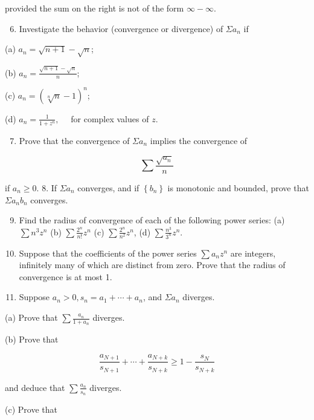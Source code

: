 \documentclass[10pt]{article}
\begin{document}
provided the sum on the right is not of the form $\infty-\infty$.

\begin{enumerate}
  \setcounter{enumi}{5}
  \item Investigate the behavior (convergence or divergence) of $\Sigma a_{n}$ if
\end{enumerate}

(a) $a_{n}=\sqrt{n+1}-\sqrt{n}$;

(b) $a_{n}=\frac{\sqrt{n+1}-\sqrt{n}}{n}$;

(c) $a_{n}=(\sqrt[n]{n}-1)^{n}$;

(d) $a_{n}=\frac{1}{1+z^{n}}, \quad$ for complex values of $z$.

\begin{enumerate}
  \setcounter{enumi}{6}
  \item Prove that the convergence of $\Sigma a_{n}$ implies the convergence of
\end{enumerate}

$$
\sum \frac{\sqrt{a_{n}}}{n}
$$

if $a_{n} \geq 0$. 8. If $\Sigma a_{n}$ converges, and if $\left\{b_{n}\right\}$ is monotonic and bounded, prove that $\Sigma a_{n} b_{n}$ converges.

\begin{enumerate}
  \setcounter{enumi}{8}
  \item Find the radius of convergence of each of the following power series:
(a) $\sum n^{3} z^{n}$
(b) $\sum \frac{2^{n}}{n !} z^{n}$
(c) $\sum \frac{2^{n}}{n^{2}} z^{n}$,
(d) $\sum \frac{n^{3}}{3^{n}} z^{n}$.

  \item Suppose that the coefficients of the power series $\sum a_{n} z^{n}$ are integers, infinitely many of which are distinct from zero. Prove that the radius of convergence is at most 1.

  \item Suppose $a_{n}>0, s_{n}=a_{1}+\cdots+a_{n}$, and $\Sigma a_{n}$ diverges.

\end{enumerate}

(a) Prove that $\sum \frac{a_{n}}{1+a_{n}}$ diverges.

(b) Prove that

$$
\frac{a_{N+1}}{s_{N+1}}+\cdots+\frac{a_{N+k}}{s_{N+k}} \geq 1-\frac{s_{N}}{s_{N+k}}
$$

and deduce that $\sum \frac{a_{n}}{s_{n}}$ diverges.

(c) Prove that
\end{document}
